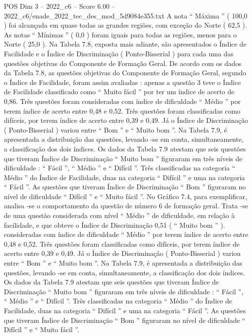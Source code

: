 \begin{textsample}{POS Dim 3 – 2022\_c6 – Score 6.00 – 2022\_c6/enade\_2022\_tec\_des\_mod\_5d9084e355.txt}
A nota “ Máxima ” ( 100,0 ) foi alcançada em quase todas as grandes regiões, com exceção do Norte ( 62,5 ).
As notas “ Mínimas ” ( 0,0 ) foram iguais para todas as regiões, menos para o Norte ( 25,0 ).
Na Tabela 7.8, exposta mais adiante, são apresentados o Índice de Facilidade e o Índice de Discriminação ( Ponto-Bisserial ) para cada uma das questões objetivas do Componente de Formação Geral.
De acordo com os dados da Tabela 7.8, as questões objetivas do Componente de Formação Geral, segundo o Índice de Facilidade, foram assim avaliadas : apenas a questão 3 teve o Índice de Facilidade classificado como “ Muito fácil ” por ter um índice de acerto de 0,86.
Três questões foram consideradas com índice de dificuldade “ Médio ” por terem índice de acerto entre 0,48 e 0,52.
Três questões foram classificadas como difíceis, por terem índice de acerto entre 0,39 e 0,49.
Já o Índice de Discriminação ( Ponto-Bisserial ) variou entre “ Bom ” e “ Muito bom ”.
Na Tabela 7.9, é apresentada a distribuição das questões, levando -se em conta, simultaneamente, a classificação dos dois índices.
Os dados da Tabela 7.9 atestam que seis questões que tiveram Índice de Discriminação “ Muito bom ” figuraram em três níveis de dificuldade : “ Fácil ”, “ Médio ” e “ Difícil ”.
Três classificadas na categoria “ Médio ” do Índice de Facilidade, duas na categoria “ Difícil ” e uma na categoria “ Fácil ”.
As questões que tiveram Índice de Discriminação “ Bom ” figuraram no nível de dificuldade “ Difícil ” e “ Muito fácil ”.
No Gráfico 7.4, para exemplificar, analisa -se o comportamento da questão de número 6 de formação geral.
Trata -se de uma questão considerada com nível “ Médio ” de dificuldade, em relação à facilidade, e que obteve o Índice de Discriminação 0,51 ( “ Muito bom ” ). consideradas com índice de dificuldade “ Médio ” por terem índice de acerto entre 0,48 e 0,52.
Três questões foram classificadas como difíceis, por terem índice de acerto entre 0,39 e 0,49.
Já o Índice de Discriminação ( Ponto-Bisserial ) variou entre “ Bom ” e “ Muito bom ”.
Na Tabela 7.9, é apresentada a distribuição das questões, levando -se em conta, simultaneamente, a classificação dos dois índices.
Os dados da Tabela 7.9 atestam que seis questões que tiveram Índice de Discriminação “ Muito bom ” figuraram em três níveis de dificuldade : “ Fácil ”, “ Médio ” e “ Difícil ”.
Três classificadas na categoria “ Médio ” do Índice de Facilidade, duas na categoria “ Difícil ” e uma na categoria “ Fácil ”.
As questões que tiveram Índice de Discriminação “ Bom ” figuraram no nível de dificuldade “ Difícil ” e “ Muito fácil ”.

\end{textsample}
